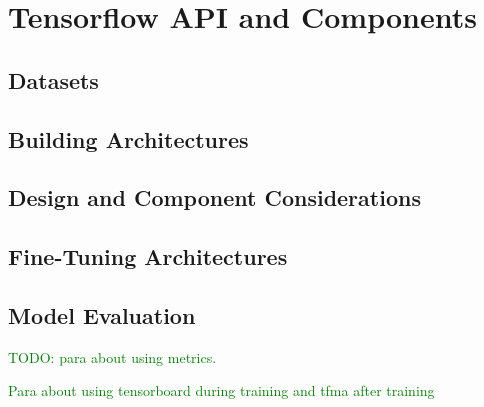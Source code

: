 \chapter{Tensorflow API and Components}

\section{Datasets}




\section{Building Architectures}








\section{Design and Component Considerations}














\section{Fine-Tuning Architectures}






\section{Model Evaluation}

\textcolor{green}{TODO: para about using metrics.}

\textcolor{green}{Para about using tensorboard during training and tfma after training}



